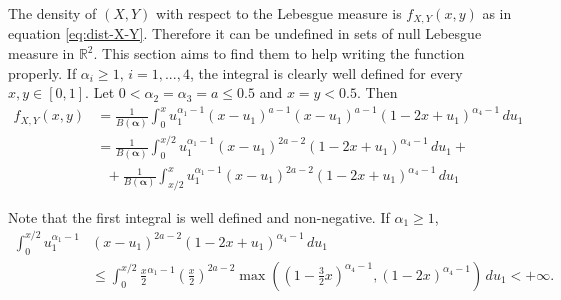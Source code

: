 \documentclass[a4paper, notitlepage, 11pt]{article}
\newcommand{\R}{\mathbb{R}}
\theoremstyle{definition}
\theoremstyle{remark}
\begin{document}
The density of $(X,Y)$ with respect to the Lebesgue measure is $f_{X,Y}(x,y)$
as in equation \eqref{eq:dist-X-Y}. Therefore it can be undefined in sets of
null Lebesgue measure in $\R^2$. This section
aims to find them to help writing the function properly. If $\alpha_i \ge 1,
\, i = 1,...,4$, the integral is clearly well defined for every $x,y \in [0,1]$. Let $0 < \alpha_2 = \alpha_3 = a \le 0.5$ and $x = y < 0.5$. Then
\begin{equation*}
  \begin{split}
    f_{X,Y}(x,y) &= \frac{1}{B(\boldsymbol{\alpha})}\int_{0}^x u_1^{\alpha_1-1}(x-u_1)^{a-1}(x-u_1)^{a-1}(1-2x+u_1)^{\alpha_4-1} \, du_1 \\
    &= \frac{1}{B(\boldsymbol{\alpha})}\int_{0}^{x/2} u_1^{\alpha_1-1}(x-u_1)^{2a-2}(1-2x+u_1)^{\alpha_4-1} \, du_1 + \\
    &~~~+ \frac{1}{B(\boldsymbol{\alpha})}\int_{x/2}^x u_1^{\alpha_1-1}(x-u_1)^{2a-2}(1-2x+u_1)^{\alpha_4-1} \, du_1
  \end{split}
\end{equation*}

Note that the first integral is well defined and non-negative. If $\alpha_1 \ge 1$, 
\begin{equation*}
  \begin{split}
    \int_{0}^{x/2} u_1^{\alpha_1-1}&(x-u_1)^{2a-2}(1-2x+u_1)^{\alpha_4-1} \, du_1 \\
    &\le \int_{0}^{x/2} \frac{x}{2}^{\alpha_1-1}\left(\frac{x}{2}\right)^{2a-2}\max\left(\left(1-\frac{3}{2}x\right)^{\alpha_4-1}, (1-2x)^{\alpha_4-1}\right) \, du_1 < +\infty.
  \end{split}
\end{equation*}
\end{document}
